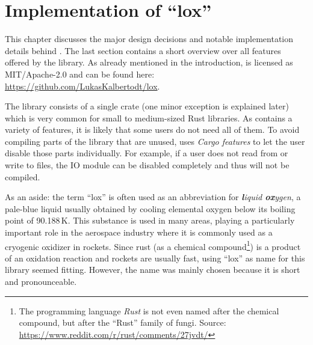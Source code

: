 \chapter{Implementation of \enquote{lox}}

This chapter discusses the major design decisions and notable implementation details behind .
The last section contains a short overview over all features offered by the library. As already mentioned in the introduction,  is licensed as MIT/Apache-2.0 and can be found here: \url{https://github.com/LukasKalbertodt/lox}.

The library consists of a single crate (one minor exception is explained later) which is very common for small to medium-sized Rust libraries.
As  contains a variety of features, it is likely that some users do not need all of them.
To avoid compiling parts of the library that are unused,  uses \emph{Cargo features} to let the user disable those parts individually.
For example, if a user does not read from or write to files, the IO module can be disabled completely and thus will not be compiled.

As an aside:
the term \enquote{lox} is often used as an abbreviation for \emph{\textbf{l}iquid \textbf{ox}ygen}, a pale-blue liquid usually obtained by cooling elemental oxygen below its boiling point of 90.188\,K.
This substance is used in many areas, playing a particularly important role in the aerospace industry where it is commonly used as a cryogenic oxidizer in rockets.
Since rust (as a chemical compound\footnote{The programming language \emph{Rust} is not even named after the chemical compound, but after the \enquote{Rust} family of fungi. Source: \url{https://www.reddit.com/r/rust/comments/27jvdt/}}) is a product of an oxidation reaction and rockets are usually fast, using \enquote{lox} as name for this library seemed fitting.
However, the name was mainly chosen because it is short and pronounceable.


\vspace{1cm}


\newpage


\newpage


\newpage



\newpage


